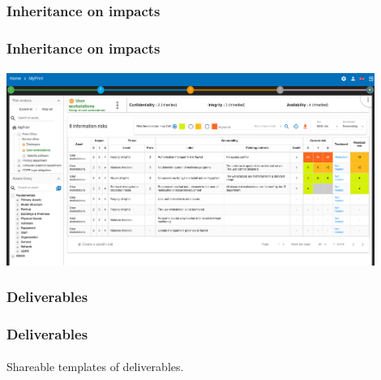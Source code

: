 \subsubsection{Inheritance on impacts}
\begin{frame}
  \frametitle{Inheritance on impacts}
  \framesubtitle{}
  \begin{center}
    \begin{center}
      \includegraphics[width=12cm]{./pictures/impacts-inheritance.png}
    \end{center}
  \end{center}
\end{frame}

\subsubsection{Deliverables}
\begin{frame}
  \frametitle{Deliverables}
  \framesubtitle{}
  Shareable templates of deliverables.
\end{frame}
